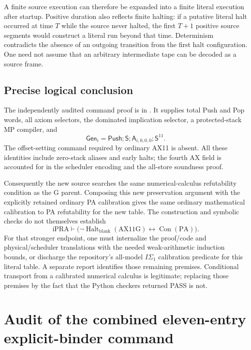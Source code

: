 A finite source execution can therefore be expanded into a finite literal
execution after startup. Positive duration also reflects finite halting:
if a putative literal halt occurred at time $T$ while the source never
halted, the first $T+1$ positive source segments would construct a literal
run beyond that time. Determinism contradicts the absence of an outgoing
transition from the first halt configuration. One need not assume that an
arbitrary intermediate tape can be decoded as a source frame.

\subsection{Precise logical conclusion}

The independently audited command proof is in .
It supplies total Push and Pop words, all axiom selectors, the dominated
implication selector, a protected-stack MP compiler, and
\[
 \mathsf{Gen}_i=\mathsf{Push};\mathsf S;
     \mathsf A_{i,0,0,0};\mathsf S^{11}.
\]
The offset-setting command required by ordinary AX11 is absent. All these
identities include zero-stack aliases and early halts; the fourth AX field
is accounted for in the scheduler encoding and the all-store soundness proof.

Consequently the new source searches the same numerical-calculus
refutability condition as the G parent. Composing this new preservation
argument with the explicitly retained ordinary PA calibration gives the
same ordinary mathematical calibration to PA refutability for the new table.
The construction and symbolic checks do not themselves establish
\[
 \mathrm{iPRA}\vdash
 \bigl(\neg\operatorname{Halt}_{\mathrm{blank}}(\mathrm{AX11G})
          \leftrightarrow\operatorname{Con}(\mathrm{PA})\bigr).
\]
For that stronger endpoint, one must internalize the proof/code and
physical/scheduler translations with the needed weak-arithmetic induction
bounds, or discharge the repository's all-model $I\Sigma_1$ calibration
predicate for this literal table. A separate report identifies those
remaining premises. Conditional transport from a calibrated numerical
calculus is legitimate; replacing those premises by the fact that the
Python checkers returned PASS is not.

\section{Audit of the combined eleven-entry explicit-binder command}
\label{sec:ax11g-audit}


